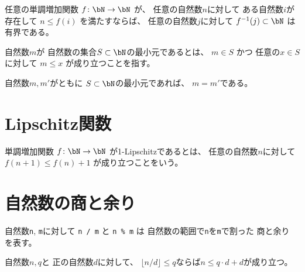 \begin{lemma}
\label{lm:finite_of_bounded_of_Nat}
\leanok
{}
\end{lemma}

\begin{lemma}
\label{lm:fib_monotone_ubd_fun_bdd}
\leanok
任意の単調増加関数
$
f \colon \bN \to \bN
$
が、
任意の自然数$n$に対して
ある自然数$i$が存在して
$
n \le f(i)
$
を満たすならば、
任意の自然数$j$に対して
$
f^{-1}(j) \subset \bN
$
は有界である。
\end{lemma}

\begin{definition}
\label{df:IsMinIn}
\leanok
自然数$m$が
自然数の集合$S \subset \bN$の最小元であるとは、
$
m \in S
$
かつ
任意の$x \in S$に対して
$
m \le x
$
が成り立つことを指す。
\end{definition}

\begin{lemma}
\label{lm:min_unique}
\leanok
自然数$m, m'$がともに
$S \subset \bN$の最小元であれば、
$m = m'$である。
\end{lemma}

\section{Lipschitz関数}

\begin{definition}
\label{df:MonotoneOneLipschitz}
\leanok
単調増加関数
$
f \colon \bN \to \bN
$
が1-Lipschitzであるとは、
任意の自然数$n$に対して
$
f(n + 1) \le f(n) + 1
$
が成り立つことをいう。
\end{definition}

\section{自然数の商と余り}

自然数\texttt{n}, \texttt{m}に対して
\texttt{n / m}
と
\texttt{n \% m}
は
自然数の範囲で\texttt{n}を\texttt{m}で割った
商と余り
を表す。

\begin{lemma}
\label{lm:nat_div_pnat_le}
\leanok
自然数$n,q$と
正の自然数$d$に対して、
$\lfloor n / d \rfloor \le q$ならば$n \le q \cdot d + d$が成り立つ。
\end{lemma}

